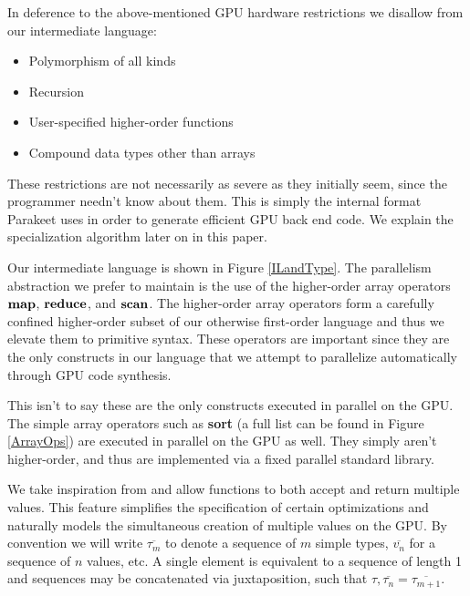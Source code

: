 \documentclass[preprint]{sigplanconf}
\begin{document}
In deference to the above-mentioned GPU hardware restrictions we disallow from our intermediate language:

\begin{itemize}
\item Polymorphism of all kinds
\item Recursion
\item User-specified higher-order functions
\item Compound data types other than arrays
\end{itemize}

These restrictions are not necessarily as severe as they initially seem, since the programmer needn't know about them. This is simply the internal format Parakeet uses in order to generate efficient GPU back end code. We explain the specialization algorithm later on in this paper.

Our intermediate language is shown in Figure \ref{ILandType}. The parallelism abstraction we prefer to maintain is the use of the higher-order array operators $\mbox{\textbf{map}}$, $\mbox{\textbf{reduce}}$, and $\mbox{\textbf{scan}}$. The higher-order array operators form a carefully confined higher-order subset of our otherwise first-order language and thus we elevate them to primitive syntax. These operators are important since they are the only constructs in our language that we attempt to parallelize automatically through GPU code synthesis.

This isn't to say these are the only constructs executed in parallel on the GPU. The simple array operators such as \textbf{sort} (a full list can be found in Figure \ref{ArrayOps}) are executed in parallel on the GPU as well. They simply aren't higher-order, and thus are implemented via a fixed parallel standard library.

We take inspiration from \cite{Bol09} and allow functions to both accept and return multiple values. This feature simplifies the specification of certain optimizations and naturally models the simultaneous creation of multiple values on the GPU. By convention we will write $\overline{\tau_m}$ to denote a sequence of $m$ simple types, $\overline{v_n}$ for a sequence  of $n$ values, etc. A single element is equivalent to a sequence of length 1 and sequences may be concatenated via juxtaposition, such that $\tau, \overline{\tau_n} = \overline{\tau_{m+1}}$.
\end{document}
